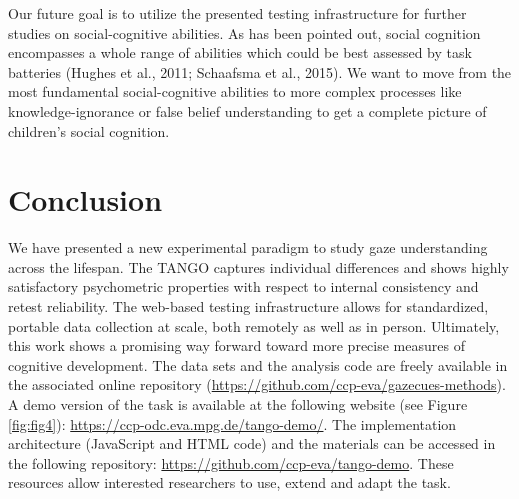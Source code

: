\documentclass[
  man,floatsintext]{apa6}
\begin{document}
Our future goal is to utilize the presented testing infrastructure for further studies on social-cognitive abilities.
As has been pointed out, social cognition encompasses a whole range of abilities which could be best assessed by task batteries (Hughes et al., 2011; Schaafsma et al., 2015).
We want to move from the most fundamental social-cognitive abilities to more complex processes like knowledge-ignorance or false belief understanding to get a complete picture of children's social cognition.

\hypertarget{conclusion}{%
\section{Conclusion}\label{conclusion}}

We have presented a new experimental paradigm to study gaze understanding across the lifespan.
The TANGO captures individual differences and shows highly satisfactory psychometric properties with respect to internal consistency and retest reliability.
The web-based testing infrastructure allows for standardized, portable data collection at scale, both remotely as well as in person.
Ultimately, this work shows a promising way forward toward more precise measures of cognitive development.
The data sets and the analysis code are freely available in the associated online repository (\url{https://github.com/ccp-eva/gazecues-methods}).
A demo version of the task is available at the following website (see Figure \ref{fig:fig4}): \url{https://ccp-odc.eva.mpg.de/tango-demo/}.
The implementation architecture (JavaScript and HTML code) and the materials can be accessed in the following repository: \url{https://github.com/ccp-eva/tango-demo}.
These resources allow interested researchers to use, extend and adapt the task.
\end{document}

